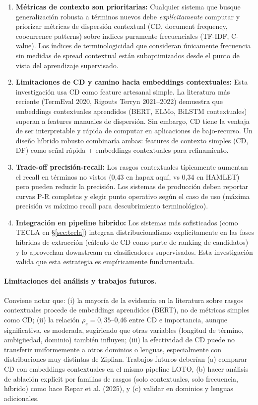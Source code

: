 \begin{enumerate}
    \item \textbf{Métricas de contexto son prioritarias:} Cualquier sistema que busque generalización robusta a términos nuevos debe \emph{explícitamente} computar y priorizar métricas de dispersión contextual (CD, document frequency, coocurrence patterns) sobre índices puramente frecuenciales (TF-IDF, C-value). Los índices de terminologicidad que consideran únicamente frecuencia sin medidas de spread contextual están suboptimizados desde el punto de vista del aprendizaje supervisado.

    \item \textbf{Limitaciones de CD y camino hacia embeddings contextuales:} Esta investigación usa CD como feature artesanal simple. La literatura más reciente (TermEval 2020, Rigouts Terryn 2021--2022) demuestra que embeddings contextuales aprendidos (BERT, ELMo, BiLSTM contextuales) superan a features manuales de dispersión. Sin embargo, CD tiene la ventaja de ser interpretable y rápida de computar en aplicaciones de bajo-recurso. Un diseño híbrido robusto combinaría ambas: features de contexto simples (CD, DF) como señal rápida + embeddings contextuales para refinamiento.

    \item \textbf{Trade-off precisión-recall:} Los rasgos contextuales típicamente aumentan el recall en términos no vistos (0{,}43 en hapax aquí, vs 0{,}34 en HAMLET) pero pueden reducir la precisión. Los sistemas de producción deben reportar curvas P-R completas y elegir punto operativo según el caso de uso (máxima precisión vs máximo recall para descubrimiento terminológico).

    \item \textbf{Integración en pipeline híbrido:} Los sistemas más sofisticados (como TECLA en §\ref{sec:tecla}) integran distribucionalismo explícitamente en las fases híbridas de extracción (cálculo de CD como parte de ranking de candidatos) y lo aprovechan downstream en clasificadores supervisados. Esta investigación valida que esta estrategia es empíricamente fundamentada.
\end{enumerate}

\paragraph{Limitaciones del análisis y trabajos futuros.}

Conviene notar que: (i) la mayoría de la evidencia en la literatura sobre rasgos contextuales procede de embeddings aprendidos (BERT), no de métricas simples como CD; (ii) la relación $\rho_s=0{,}35$--0{,}46 entre CD e importancia, aunque significativa, es moderada, sugiriendo que otras variables (longitud de término, ambigüedad, dominio) también influyen; (iii) la efectividad de CD puede no transferir uniformemente a otros dominios o lenguas, especialmente con distribuciones muy distintas de Zipfian. Trabajos futuros deberían (a) comparar CD con embeddings contextuales en el mismo pipeline LOTO, (b) hacer análisis de ablación explicit por familias de rasgos (solo contextuales, solo frecuencia, híbrido) como hace Repar et al. (2025), y (c) validar en dominios y lenguas adicionales.

